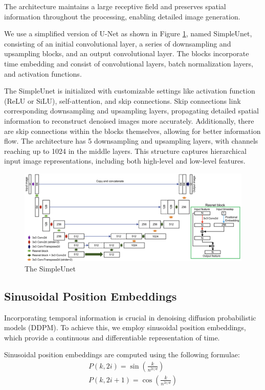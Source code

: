 \documentclass[letterpaper]{article} %
\begin{document}
The architecture maintains a large receptive field and preserves spatial information throughout the processing, enabling detailed image generation.  

We use a simplified version of U-Net as shown in Figure \ref{fig:figure3}, named SimpleUnet, consisting of an initial convolutional layer, a series of downsampling and upsampling blocks, and an output convolutional layer. The blocks incorporate time embedding and consist of convolutional layers, batch normalization layers, and activation functions.

The SimpleUnet is initialized with customizable settings like activation function (ReLU or SiLU), self-attention, and skip connections.
Skip connections link corresponding downsampling and upsampling layers, propagating detailed spatial information to reconstruct denoised images more accurately. Additionally, there are skip connections within the blocks themselves, allowing for better information flow. The architecture has 5 downsampling and upsampling layers, with channels reaching up to 1024 in the middle layers. This structure captures hierarchical input image representations, including both high-level and low-level features.

\begin{figure}[htbp]
    \centering
    \includegraphics[width=0.8\linewidth]{f3.png} %
    \caption{The SimpleUnet}
    \label{fig:figure3}
\end{figure}

\subsection{Sinusoidal Position Embeddings}
Incorporating temporal information is crucial in denoising diffusion probabilistic models (DDPM). To achieve this, we employ sinusoidal position embeddings, which provide a continuous and differentiable representation of time.

Sinusoidal position embeddings are computed using the following formulae:
\begin{equation}
\begin{aligned}
P(k, 2 i)=\sin \left(\frac{k}{n^{2 i / d}}\right) \\
P(k, 2 i+1)=\cos \left(\frac{k}{n^{2 i / d}}\right)
\end{aligned}
\end{equation}
\end{document}

